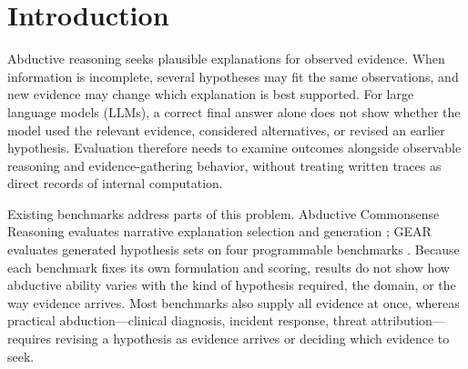 
\section{Introduction}
\label{sec:introduction}

Abductive reasoning seeks plausible explanations for observed evidence. When information is incomplete, several hypotheses may fit the same observations, and new evidence may change which explanation is best supported. For large language models (LLMs), a correct final answer alone does not show whether the model used the relevant evidence, considered alternatives, or revised an earlier hypothesis. Evaluation therefore needs to examine outcomes alongside observable reasoning and evidence-gathering behavior, without treating written traces as direct records of internal computation.

Existing benchmarks address parts of this problem. Abductive Commonsense Reasoning evaluates narrative explanation selection and generation \citep{Bhagavatula2020Abductive}; GEAR evaluates generated hypothesis sets on four programmable benchmarks \citep{impl_he2025gear}. Because each benchmark fixes its own formulation and scoring, results do not show how abductive ability varies with the kind of hypothesis required, the domain, or the way evidence arrives. Most benchmarks also supply all evidence at once, whereas practical abduction---clinical diagnosis, incident response, threat attribution---requires revising a hypothesis as evidence arrives or deciding which evidence to seek.

